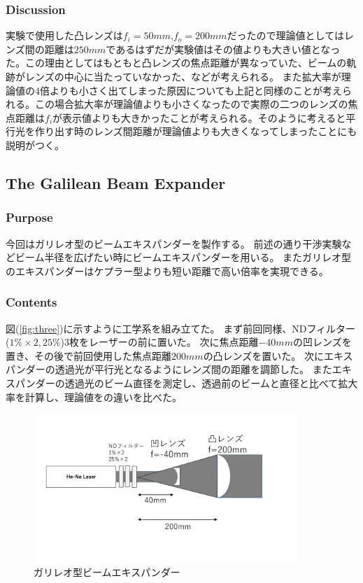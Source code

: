 \documentclass[11pt, a4paper]{jsarticle}
\begin{document}
\subsubsection{Discussion}
実験で使用した凸レンズは$f_i = 50mm$,$f_o = 200mm$だったので理論値としてはレンズ間の距離は$250mm$であるはずだが実験値はその値よりも大きい値となった。この理由としてはもともと凸レンズの焦点距離が異なっていた、ビームの軌跡がレンズの中心に当たっていなかった、などが考えられる。
また拡大率が理論値の4倍よりも小さく出てしまった原因についても上記と同様のことが考えられる。この場合拡大率が理論値よりも小さくなったので実際の二つのレンズの焦点距離は$f_i$が表示値よりも大きかったことが考えられる。そのように考えると平行光を作り出す時のレンズ間距離が理論値よりも大きくなってしまったことにも説明がつく。
\subsection{The Galilean Beam Expander}
\subsubsection{Purpose}
今回はガリレオ型のビームエキスパンダーを製作する。
前述の通り干渉実験などビーム半径を広げたい時にビームエキスパンダーを用いる。
またガリレオ型のエキスパンダーはケプラー型よりも短い距離で高い倍率を実現できる。
\subsubsection{Contents}
図(\ref{fig:three})に示すように工学系を組み立てた。
まず前回同様、NDフィルター($1\%\times2,25\%$)3枚をレーザーの前に置いた。
次に焦点距離$-40mm$の凹レンズを置き、その後で前回使用した焦点距離$200mm$の凸レンズを置いた。
次にエキスパンダーの透過光が平行光となるようにレンズ間の距離を調節した。
またエキスパンダーの透過光のビーム直径を測定し、透過前のビームと直径と比べて拡大率を計算し、理論値をの違いを比べた。
\begin{figure}[htbp]
 \begin{center}
  \includegraphics[width=100mm]{fig4.png}
 \end{center}
 \caption{ガリレオ型ビームエキスパンダー}
 \label{fig:four}
\end{figure}
\end{document}
